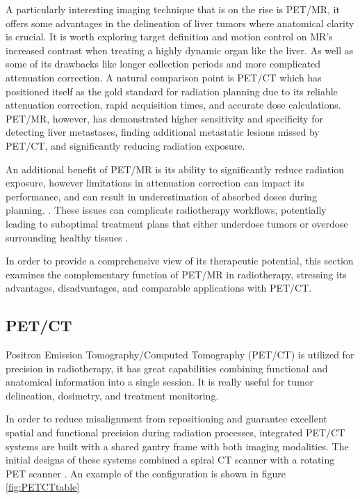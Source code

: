 \begin{multicols}{2}


A particularly interesting imaging technique that is on the rise is PET/MR, it offers some advantages in the delineation of liver tumors where anatomical clarity is crucial. It is worth exploring target definition and motion control on MR's increased contrast when treating a highly dynamic organ like the liver. As well as some of its drawbacks like longer collection periods and more complicated attenuation correction. A natural comparison point is PET/CT which has positioned itself as the gold standard for radiation planning due to its reliable attenuation correction, rapid acquisition times, and accurate dose calculations. PET/MR, however, has demonstrated higher sensitivity and specificity for detecting liver metastases, finding additional metastatic lesions missed by PET/CT, and significantly reducing radiation exposure. \cite{frontiers2021, springer2014}

An additional benefit of PET/MR is its ability to significantly reduce radiation exposure, however limitations in attenuation correction can impact its performance, and can result in underestimation of absorbed doses during planning. \cite{ajr2012, pmc2017}.
These issues can complicate radiotherapy workflows, potentially leading to suboptimal treatment plans that either underdose tumors or overdose surrounding healthy tissues \cite{pmc2023}.

In order to provide a comprehensive view of its therapeutic potential, this section examines the complementary function of PET/MR in radiotherapy, stressing its advantages, disadvantages, and comparable applications with PET/CT.

\subsection{PET/CT}
Positron Emission Tomography/Computed Tomography (PET/CT) is utilized for precision in radiotherapy, it has great capabilities combining functional and anatomical information into a single session. It is really useful for tumor delineation, dosimetry, and treatment monitoring.

In order to reduce misalignment from repositioning and guarantee excellent spatial and functional precision during radiation processes, integrated PET/CT systems are built with a shared gantry frame with both imaging modalities. The initial designs of these systems combined a spiral CT scanner with a rotating PET scanner \cite{beyer2000, bennett2009}. An example of the configuration is shown in figure \ref{fig:PETCTtable}


\end{multicols}
